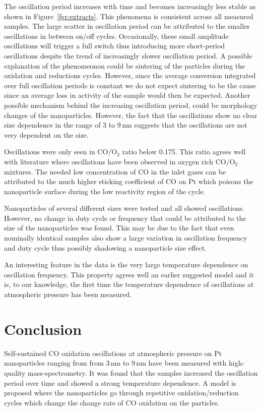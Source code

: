 \documentclass[8.5pt,twoside,twocolumn]{article}
\begin{document}
The oscillation period increases with time and becomes increasingly less stable as shown in Figure~\ref{fgr:extracts}. This phenomena is consistent across all measured samples. The large scatter in oscillation period can be attributed to the smaller oscillations in between on/off cycles. Occasionally, these small amplitude oscillations will trigger a full switch thus introducing more short-period oscillations despite the trend of increasingly slower oscillation period. A possible explanation of the phenomeonon could be sintering of the particles during the oxidation and reductions cycles. However, since the average conversion integrated over full oscillation periods is constant we do not expect sintering to be the cause since an average loss in activity of the sample would then be expected. Another possible mechanism behind the increasing oscillation period, could be morphology changes of the nanoparticles. However, the fact that the oscillations show no clear size dependence in the range of 3 to 9\,nm suggests that the oscillations are not very dependent on the size.

Oscillations were only seen in CO/O$_2$ ratio below 0.175. This ratio agrees well with literature \cite{Singh2010,Hendriksen2005} where oscillations have been observed in oxygen rich CO/O$_2$ mixtures. The needed low concentration of CO in the inlet gases can be attributed to the much higher sticking coefficient of CO on Pt which poisons the nanoparticle surface during the low reactivity region of the cycle. 

Nanoparticles of several different sizes were tested and all showed oscillations. However, no change in duty cycle or frequency that could be attributed to the size of the nanoparticles was found. This may be due to the fact that even nominally identical samples also show a large variation in oscillation frequency and duty cycle thus possibly shadowing a nanoparticle size effect.

An interesting feature in the data is the very large temperature dependence on oscillation frequency. This property agrees well an earlier suggested model \cite{Hendriksen2010} and it is, to our knowledge, the first time the temperature dependence of oscillations at atmospheric pressure has been measured.

\section{Conclusion}
Self-sustained CO oxidation oscillations at atmospheric pressure on Pt nanoparticles ranging from from 3\,nm to 9\,nm have been measured with high-quality mass-spectrometry. It was found that the samples increased the oscillation period over time and showed a strong temperature dependence. A model is proposed where the nanoparticles go through repetitive oxidation/reduction cycles which change the change rate of CO oxidation on the particles.


\footnotesize{
}
\end{document}
